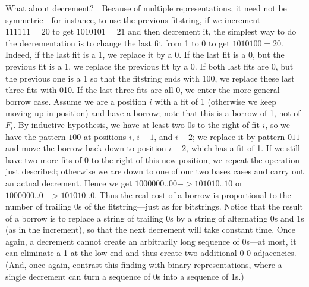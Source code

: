 \documentclass[11pt]{article}
\begin{document}
What about decrement?\ \ Because of multiple representations, it need not be
symmetric---for instance, to use the previous fitstring, if we increment
$111111=20$ to get $1010101=21$ and then decrement it, the simplest way to do
the decrementation is to change the last fit from 1 to 0 to get $1010100=20$.
Indeed, if the last fit is a 1, we replace it by a 0.  If the last fit is a 0,
but the previous fit is a 1, we replace the previous fit by a 0.  If both last
fits are 0, but the previous one is a 1 so that the fitstring ends with 100, we
replace these last three fits with 010.  If the last three fits are all 0, we
enter the more general borrow case.  Assume we are a position $i$ with a fit of
1 (otherwise we keep moving up in position) and have a borrow; note that this
is a borrow of 1, not of $F_i$.  By inductive hypothesis, we have at least two
0s to the right of fit $i$, so we have the pattern $100$ at positions $i$,
$i-1$, and $i-2$; we replace it by pattern $011$ and move the borrow back down
to position $i-2$, which has a fit of 1.  If we still have two more fits of 0
to the right of this new position, we repeat the operation just described;
otherwise we are down to one of our two bases cases and carry out an actual
decrement.  Hence we get $1000000..00 -> 101010..10$ or $1000000..0 ->
101010..0$.  Thus the real cost of a borrow is proportional to the number of
trailing 0s of the fitstring---just as for bitstrings.  Notice that the result
of a borrow is to replace a string of trailing 0s by a string of alternating 0s
and 1s (as in the increment), so that the next decrement will take constant
time.  Once again, a decrement cannot create an arbitrarily long sequence of
0s---at most, it can eliminate a 1 at the low end and thus create two
additional 0-0 adjacencies.  (And, once again, contrast this finding with
binary representations, where a single decrement can turn a sequence of 0s into
a sequence of 1s.)
\end{document}
